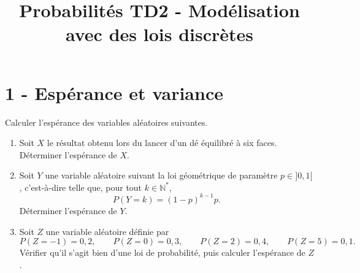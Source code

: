 

\title{Probabilités TD2 - Modélisation avec des lois discrètes}

\author{}
\date{}



\sffamily
\maketitle





\section*{1 - Espérance et variance}
Calculer l'espérance des variables aléatoires suivantes.

\begin{enumerate}
    \item Soit $X$ le résultat obtenu lors du lancer d'un dé équilibré à six faces. Déterminer l'espérance de $X$.
    \item Soit $Y$ une variable aléatoire suivant la loi géométrique de paramètre $p \in ]0,1[$, c'est-à-dire telle que, pour tout $k \in \mathbb{N}^*$,
    $$
    P(Y=k)=(1-p)^{k-1}p.
    $$
    Déterminer l'espérance de $Y$.
    \item Soit $Z$ une variable aléatoire définie par
    $$
    P(Z=-1)=0,2,\qquad P(Z=0)=0,3,\qquad P(Z=2)=0,4,\qquad P(Z=5)=0,1.
    $$
    Vérifier qu'il s'agit bien d'une loi de probabilité, puis calculer l'espérance de $Z$.

\end{enumerate}
